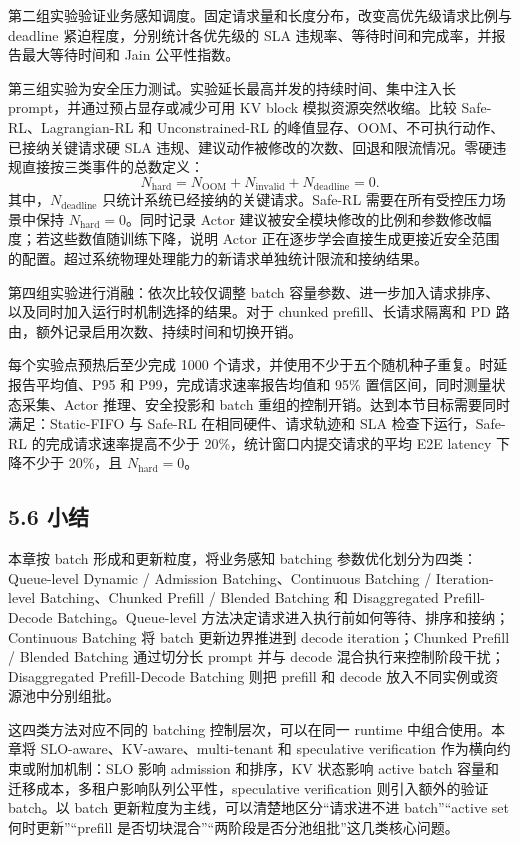 第二组实验验证业务感知调度。固定请求量和长度分布，改变高优先级请求比例与 deadline 紧迫程度，分别统计各优先级的 SLA 违规率、等待时间和完成率，并报告最大等待时间和 Jain 公平性指数。

第三组实验为安全压力测试。实验延长最高并发的持续时间、集中注入长 prompt，并通过预占显存或减少可用 KV block 模拟资源突然收缩。比较 Safe-RL、Lagrangian-RL 和 Unconstrained-RL 的峰值显存、OOM、不可执行动作、已接纳关键请求硬 SLA 违规、建议动作被修改的次数、回退和限流情况。零硬违规直接按三类事件的总数定义：
\[
N_{\mathrm{hard}}=
N_{\mathrm{OOM}}+N_{\mathrm{invalid}}+N_{\mathrm{deadline}}=0.
\]
其中，\(N_{\mathrm{deadline}}\) 只统计系统已经接纳的关键请求。Safe-RL 需要在所有受控压力场景中保持 \(N_{\mathrm{hard}}=0\)。同时记录 Actor 建议被安全模块修改的比例和参数修改幅度；若这些数值随训练下降，说明 Actor 正在逐步学会直接生成更接近安全范围的配置。超过系统物理处理能力的新请求单独统计限流和接纳结果。

第四组实验进行消融：依次比较仅调整 batch 容量参数、进一步加入请求排序、以及同时加入运行时机制选择的结果。对于 chunked prefill、长请求隔离和 PD 路由，额外记录启用次数、持续时间和切换开销。

每个实验点预热后至少完成 1000 个请求，并使用不少于五个随机种子重复。时延报告平均值、P95 和 P99，完成请求速率报告均值和 95\% 置信区间，同时测量状态采集、Actor 推理、安全投影和 batch 重组的控制开销。达到本节目标需要同时满足：Static-FIFO 与 Safe-RL 在相同硬件、请求轨迹和 SLA 检查下运行，Safe-RL 的完成请求速率提高不少于 20\%，统计窗口内提交请求的平均 E2E latency 下降不少于 20\%，且 \(N_{\mathrm{hard}}=0\)。
\subsection*{5.6 小结}

本章按 batch 形成和更新粒度，将业务感知 batching 参数优化划分为四类：Queue-level Dynamic / Admission Batching、Continuous Batching / Iteration-level Batching、Chunked Prefill / Blended Batching 和 Disaggregated Prefill-Decode Batching。Queue-level 方法决定请求进入执行前如何等待、排序和接纳；Continuous Batching 将 batch 更新边界推进到 decode iteration；Chunked Prefill / Blended Batching 通过切分长 prompt 并与 decode 混合执行来控制阶段干扰；Disaggregated Prefill-Decode Batching 则把 prefill 和 decode 放入不同实例或资源池中分别组批。

这四类方法对应不同的 batching 控制层次，可以在同一 runtime 中组合使用。本章将 SLO-aware、KV-aware、multi-tenant 和 speculative verification 作为横向约束或附加机制：SLO 影响 admission 和排序，KV 状态影响 active batch 容量和迁移成本，多租户影响队列公平性，speculative verification 则引入额外的验证 batch。以 batch 更新粒度为主线，可以清楚地区分“请求进不进 batch”“active set 何时更新”“prefill 是否切块混合”“两阶段是否分池组批”这几类核心问题。

